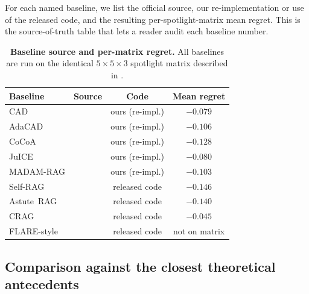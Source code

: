 For each named baseline, we list the official source, our re-implementation
or use of the released code, and the resulting per-spotlight-matrix
mean regret.  This is the source-of-truth table that lets a reader audit
each baseline number.

\begin{table}[H]
\centering\small
\caption{\textbf{Baseline source and per-matrix regret.}  All baselines
are run on the identical $5\!\times\!5\!\times\!3$ spotlight matrix
described in .}
\label{tab:baseline-source}
\setlength{\tabcolsep}{4pt}
\begin{tabular}{llcc}
\toprule
\textbf{Baseline} & \textbf{Source} & \textbf{Code} & \textbf{Mean regret}\\
\midrule
CAD               & \citet{shi2024cad}              & ours (re-impl.) & $-0.079$ \\
AdaCAD            & \citet{wang2025adacad}          & ours (re-impl.) & $-0.106$ \\
CoCoA             & \citet{khandelwal2025cocoa}     & ours (re-impl.) & $-0.128$ \\
JuICE             & \citet{li2025taming}            & ours (re-impl.) & $-0.080$ \\
MADAM-RAG         & \citet{wang2025ramdocs}        & ours (re-impl.) & $-0.103$ \\
Self-RAG          & \citet{asai2024selfrag}         & released code   & $-0.146$ \\
Astute~RAG        & \citet{wang2024astuterag}       & released code   & $-0.140$ \\
CRAG              & \citet{yan2024crag}             & released code   & $-0.045$ \\
FLARE-style       & \citet{jiang2023flare}          & released code   & not on matrix\\
\bottomrule
\end{tabular}
\end{table}


\subsection{Comparison against the closest theoretical antecedents}
\label{app:antecedent-comparison}

